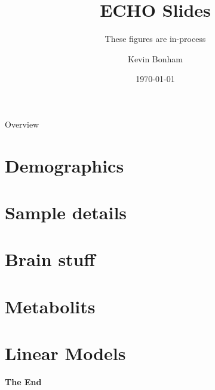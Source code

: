 \documentclass[aspectratio=169,xcolor=dvipsnames]{beamer}
\title[short title]{ECHO Slides} %
\subtitle{These figures are in-process}
\author[Bonham] {Kevin Bonham}
\institute[Wellesley College] %
{
    Department of Biological Sciences \\
    Wellesley College
}
\date{\today} %
\begin{document}
\begin{frame}
    \titlepage
\end{frame}

\begin{frame}{Overview}
    \tableofcontents
\end{frame}


\section{Demographics}



\section{Sample details}



\section{Brain stuff}



\section{Metabolits}



\section{Linear Models}



\begin{frame}
    \Huge{\centerline{\textbf{The End}}}
\end{frame}

\end{document}
